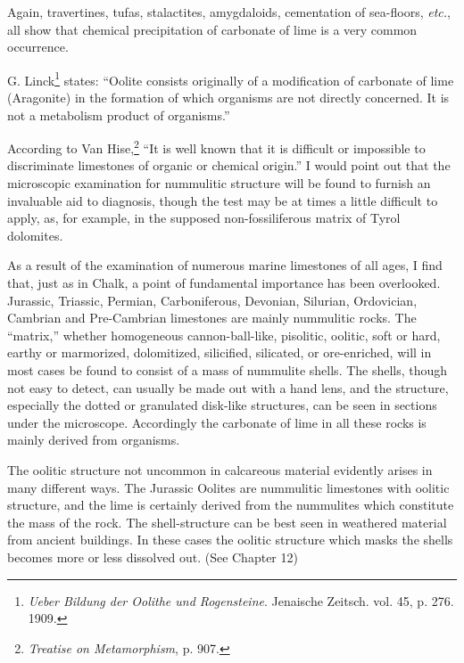 \documentclass[a4paper, 12pt, oneside]{article}
\begin{document}
Again, travertines, tufas, stalactites, amygdaloids, cementation of sea-floors, \emph{etc.}, all show that chemical precipitation of carbonate of lime is a very common occurrence.

G. Linck\footnote{\emph{Ueber Bildung der Oolithe und Rogensteine}. Jenaische Zeitsch. vol. 45, p. 276. 1909.} states: ``Oolite consists originally of a modification of carbonate of lime (Aragonite) in the formation of which organisms are not directly concerned. It is not a metabolism product of organisms.''

According to Van Hise,\footnote{\emph{Treatise on Metamorphism}, p. 907.} ``It is well known that it is difficult or impossible to discriminate limestones of organic or chemical origin.'' I would point out that the microscopic examination for nummulitic structure will be found to furnish an invaluable aid to diagnosis, though the test may be at times a little difficult to apply, as, for example, in the supposed non-fossiliferous matrix of Tyrol dolomites.

As a result of the examination of numerous marine limestones of all ages, I find that, just as in Chalk, a point of fundamental importance has been overlooked. Jurassic, Triassic, Permian, Carboniferous, Devonian, Silurian, Ordovician, Cambrian and Pre-Cambrian limestones are mainly nummulitic rocks. The ``matrix,'' whether homogeneous cannon-ball-like, pisolitic, oolitic, soft or hard, earthy or marmorized, dolomitized, silicified, silicated, or ore-enriched, will in most cases be found to consist of a mass of nummulite shells. The shells, though not easy to detect, can usually be made out with a hand lens, and the structure, especially the dotted or granulated disk-like structures, can be seen in sections under the microscope. Accordingly the carbonate of lime in all these rocks is mainly derived from organisms.

The oolitic structure not uncommon in calcareous material evidently arises in many different ways. The Jurassic Oolites are nummulitic limestones with oolitic structure, and the lime is certainly derived from the nummulites which constitute the mass of the rock. The shell-structure can be best seen in weathered material from ancient buildings. In these cases the oolitic structure which masks the shells becomes more or less dissolved out. (See Chapter 12)
\end{document}
